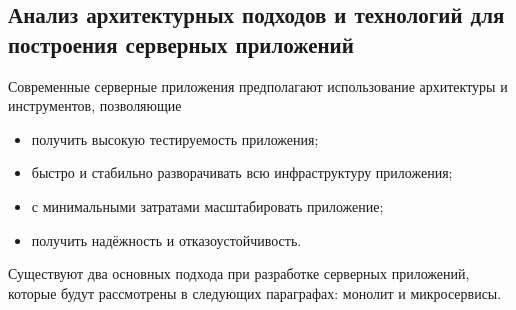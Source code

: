 \subsection{Анализ архитектурных подходов и технологий для построения серверных приложений}
\label{sec:analysis:research:mobArch}

Современные серверные приложения предполагают использование архитектуры и инструментов, позволяющие

\begin{itemize}
\item получить высокую тестируемость приложения;
\item быстро и стабильно разворачивать всю инфраструктуру приложения;
\item с минимальными затратами масштабировать приложение;
\item получить надёжность и отказоустойчивость.
\end{itemize}

Существуют два основных подхода при разработке серверных приложений, которые будут рассмотрены в следующих параграфах: монолит и микросервисы.


